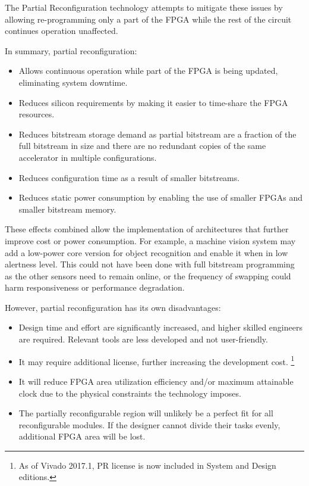 The Partial Reconfiguration technology attempts to mitigate these issues by allowing re-programming
only a part of the FPGA while the rest of the circuit continues operation unaffected.

In summary, partial reconfiguration:

\begin{itemize}
\item	Allows continuous operation while part of the FPGA is being updated, eliminating system downtime.
\item	Reduces silicon requirements by making it easier to time-share the FPGA resources.
\item	Reduces bitstream storage demand as partial bitstream are a fraction of the full bitstream in size
	and there are no redundant copies of the same accelerator in multiple configurations.
\item	Reduces configuration time as a result of smaller bitstreams.
\item	Reduces static power consumption by enabling the use of smaller FPGAs and smaller bitstream memory.
\end{itemize}

These effects combined allow the implementation of architectures that further improve cost or power consumption.
For example, a machine vision system may add a low-power core version for object recognition
and enable it when in low alertness level.
This could not have been done with full bitstream programming as the other
sensors need to remain online, or the frequency of swapping could harm responsiveness or performance degradation.

However, partial reconfiguration has its own disadvantages:

\begin{itemize}
\item	Design time and effort are significantly increased, and higher skilled engineers are required.
	Relevant tools are less developed and not user-friendly.
\item	It may require additional license, further increasing the development cost.
	\footnote{As of Vivado 2017.1, PR license is now included in System and Design editions.}
\item	It will reduce FPGA area utilization efficiency and/or maximum attainable clock
	due to the physical constraints the technology imposes.
\item	The partially reconfigurable region will unlikely be a perfect fit for all reconfigurable modules.
	If the designer cannot divide their tasks evenly, additional FPGA area will be lost.
\end{itemize}

